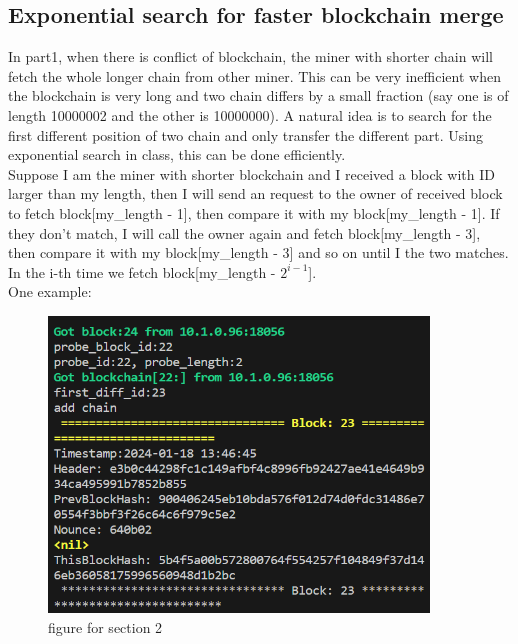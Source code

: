 \documentclass{article}
\begin{document}
\begin{spacing}{1.0}
		\subsection{Exponential search for faster blockchain merge}
		In part1, when there is conflict of blockchain, the miner with shorter chain will fetch the whole longer chain from other miner. This can be very inefficient 
		when the blockchain is very long and two chain differs by a small fraction (say one is of length 10000002 and the other is 10000000). A natural idea is to 
		search for the first different position of two chain and only transfer the different part. Using exponential search in class, this can be done efficiently.
		\\
		Suppose I am the miner with shorter blockchain and I received a block with ID larger than my length, then I will send an request to the owner of
		received block to fetch block[my\_length - 1], then compare it with my block[my\_length - 1]. If they don't match, I will call the owner again and fetch block[my\_length - 3],
		then compare it with my block[my\_length - 3] and so on until I the two matches. In the i-th time we fetch block[my\_length - $2^{i-1}$].
		\\One example:
		\begin{figure}[htbp]
			\centering
			\includegraphics[width=0.9\textwidth]{./Exponential-search.png}
			\caption{figure for section 2}
		\end{figure}
\end{spacing}
\end{document}
